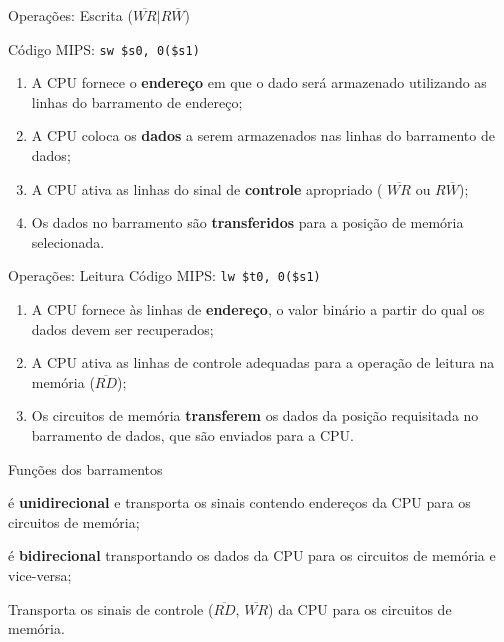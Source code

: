 \begin{frame}{Operações: Escrita ({\tt $\overline{WR}|R\overline{W}$})}
  
  Código MIPS: \hfil{\tt sw \$s0, 0(\$s1)}\hfill\\\bigskip

  \begin{enumerate}[<+-| alert@+>]
  \item A CPU fornece o {\bf endereço} em que o dado será armazenado
    utilizando as linhas do barramento de endereço;
  \item A CPU coloca os {\bf dados} a serem armazenados nas linhas do
    barramento de dados;
  \item A CPU ativa as linhas do sinal de {\bf controle} apropriado ({
      $\overline{WR}$ ou $R\overline{W}$});
  \item Os dados no barramento são {\bf transferidos} para a posição de
    memória selecionada.
  \end{enumerate}
  
\end{frame}

\begin{frame}{Operações: Leitura}
  Código MIPS: \hfil{\tt lw \$t0, 0(\$s1)}\hfill\\\bigskip

  \begin{enumerate}[<+-| alert@+>]
  \item A CPU fornece às linhas de {\bf endereço}, o valor binário a partir
    do qual os dados devem ser recuperados;
  \item A CPU ativa as linhas de controle adequadas para a operação de
    leitura na memória ({$\overline{RD}$});
  \item Os circuitos de memória {\bf transferem} os dados da posição
    requisitada no barramento de dados, que são enviados para a CPU.
  \end{enumerate}
\end{frame}

\begin{frame}{Funções dos barramentos}

  \begin{description}[<+-| alert@+>]
  \item[Barramento de endereço:] é {\bf unidirecional} e transporta os
    sinais contendo endereços da CPU para os circuitos de memória;
  \item[Barramento de dados:] é {\bf bidirecional} transportando os
    dados da CPU para os circuitos de memória e vice-versa;
  \item[Barramento de controle:] Transporta os sinais de controle
    ({$\overline{RD}$, $\overline{WR}$}) da
    CPU para os circuitos de memória.
  \end{description}
  
\end{frame}

